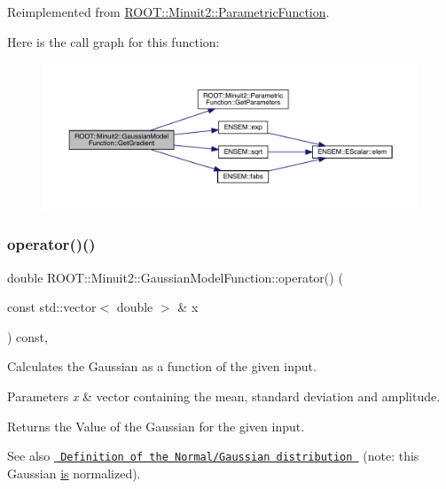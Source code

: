 Reimplemented from \mbox{\hyperlink{classROOT_1_1Minuit2_1_1ParametricFunction_abe6cfa5c64c578101da1d6fcecfb2249}{R\+O\+O\+T\+::\+Minuit2\+::\+Parametric\+Function}}.

Here is the call graph for this function\+:
\nopagebreak
\begin{figure}[H]
\begin{center}
\leavevmode
\includegraphics[width=350pt]{d4/df6/classROOT_1_1Minuit2_1_1GaussianModelFunction_ac81a3c5531a291b8a9c3af533de07195_cgraph}
\end{center}
\end{figure}
\mbox{\label{classROOT_1_1Minuit2_1_1GaussianModelFunction_af4102c5eecd496d63c5592f7519248ce}} 
\subsubsection{\texorpdfstring{operator()()}{operator()()}\hspace{0.1cm}{\footnotesize\ttfamily [1/4]}}
{\footnotesize\ttfamily double R\+O\+O\+T\+::\+Minuit2\+::\+Gaussian\+Model\+Function\+::operator() (\begin{DoxyParamCaption}\item[{const std\+::vector$<$ double $>$ \&}]{x }\end{DoxyParamCaption}) const\hspace{0.3cm}{\ttfamily [inline]}, {\ttfamily [virtual]}}

Calculates the Gaussian as a function of the given input.


\begin{DoxyParams}{Parameters}
{\em x} & vector containing the mean, standard deviation and amplitude.\\
\hline
\end{DoxyParams}
\begin{DoxyReturn}{Returns}
the Value of the Gaussian for the given input.
\end{DoxyReturn}
\begin{DoxySeeAlso}{See also}
\href{http://mathworld.wolfram.com/NormalDistribution.html}{\texttt{ Definition of the Normal/\+Gaussian distribution }} (note\+: this Gaussian \mbox{\hyperlink{x_8cc_a81abbbdef81e25584a2eab888e643d3d}{is}} normalized). 
\end{DoxySeeAlso}


